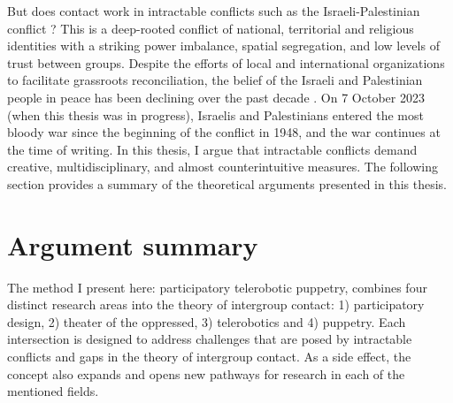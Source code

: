 \documentclass[dissertation,math,vertlayout,pdfa,colorlinks]{aaltoseries}
\begin{document}
But does contact work in intractable conflicts such as the Israeli-Palestinian conflict \cite{bar-talIntractableConflictsSociopsychological2013,maozDoesContactWork2011}? This is a deep-rooted conflict of national, territorial and religious identities with a striking power imbalance, spatial segregation, and low levels of trust between groups. Despite the efforts of local and international organizations to facilitate grassroots reconciliation, the belief of the Israeli and Palestinian people in peace has been declining over the past decade \cite{cavatortaAnalysisChangingIsraeli2024,haslerYoungGenerationsHopelessness2023}. On 7 October 2023 (when this thesis was in progress), Israelis and Palestinians entered the most bloody war since the beginning of the conflict in 1948, and the war continues at the time of writing. In this thesis, I argue that intractable conflicts demand creative, multidisciplinary, and almost counterintuitive measures. The following section provides a summary of the theoretical arguments presented in this thesis.

\section{Argument summary}
The method I present here: participatory telerobotic puppetry, combines four distinct research areas into the theory of intergroup contact: 1) participatory design, 2) theater of the oppressed, 3) telerobotics and 4) puppetry. Each intersection is designed to address challenges that are posed by intractable conflicts and gaps in the theory of intergroup contact. As a side effect, the concept also expands and opens new pathways for research in each of the mentioned fields.
\end{document}
